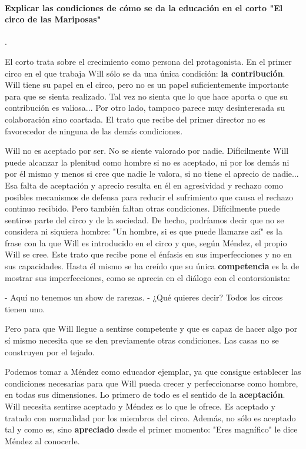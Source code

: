 
\paragraph{Explicar las condiciones de cómo se da la educación en el corto "El circo de las Mariposas"}.

\newcommand{\nick}{Will\xspace}
\newcommand{\mendez}{Méndez\xspace}


El corto trata sobre el crecimiento como persona del protagonista. 
%
En el primer circo en el que trabaja \nick sólo se da una única condición: \textbf{la contribución}. 
%
\nick tiene su papel en el circo, pero no es un papel suficientemente importante para que se sienta realizado. 
%
Tal vez no sienta que lo que hace aporta o que su contribución es valiosa... Por otro lado, tampoco parece muy desinteresada su colaboración sino coartada. 
%
El trato que recibe del primer director no es favorecedor de ninguna de las demás condiciones.

\nick no es aceptado por ser. No se siente valorado por nadie. 
%
Difícilmente \nick puede alcanzar la plenitud como hombre si no es aceptado, ni por los demás ni por él mismo y menos si cree que nadie le valora, si no tiene el aprecio de nadie...
%
Esa falta de aceptación y aprecio resulta en él en agresividad y rechazo como posibles mecanismos de defensa para reducir el sufrimiento que causa el rechazo continuo recibido.
%
Pero también faltan otras condiciones. 
%
Difícilmente puede sentirse parte del circo y de la sociedad. De hecho, podríamos decir que no se considera ni siquiera hombre:
"Un hombre, si es que puede llamarse así" es la frase con la que \nick es introducido en el circo y que, según \mendez, el propio \nick se cree.
%
Este trato que recibe pone el énfasis en sus imperfecciones y no en sus capacidades.
%
Hasta él mismo se ha creído que su única \textbf{competencia} es la de mostrar sus imperfecciones, como se aprecia en el diálogo con el contorsionista:

- Aquí no tenemos un show de rarezas.
- ¿Qué quieres decir? Todos los circos tienen uno. 

Pero para que \nick llegue a sentirse competente y que es capaz de hacer algo por sí mismo necesita que se den previamente otras condiciones.
%
Las casas no se construyen por el tejado.



Podemos tomar a \mendez como educador ejemplar, ya que consigue establecer las condiciones necesarias para que \nick pueda crecer y perfeccionarse como hombre, en todas sus dimensiones.
%
Lo primero de todo es el sentido de la \textbf{aceptación}.
%
\nick necesita sentirse aceptado y \mendez es lo que le ofrece. 
%
Es aceptado y tratado con normalidad por los miembros del circo.
%
Además, no sólo es aceptado tal y como es, sino \textbf{apreciado} desde el primer momento: "Eres magnífico" le dice \mendez al conocerle.

